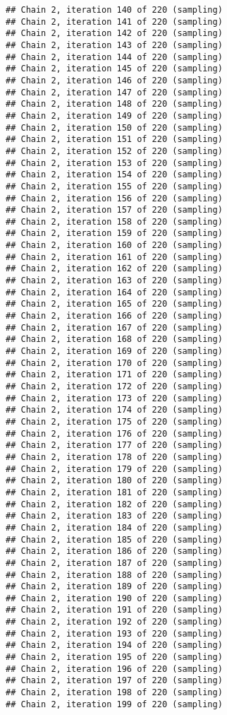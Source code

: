 \documentclass[]{book}
\begin{document}
\begin{verbatim}
## Chain 2, iteration 140 of 220 (sampling)
## Chain 2, iteration 141 of 220 (sampling)
## Chain 2, iteration 142 of 220 (sampling)
## Chain 2, iteration 143 of 220 (sampling)
## Chain 2, iteration 144 of 220 (sampling)
## Chain 2, iteration 145 of 220 (sampling)
## Chain 2, iteration 146 of 220 (sampling)
## Chain 2, iteration 147 of 220 (sampling)
## Chain 2, iteration 148 of 220 (sampling)
## Chain 2, iteration 149 of 220 (sampling)
## Chain 2, iteration 150 of 220 (sampling)
## Chain 2, iteration 151 of 220 (sampling)
## Chain 2, iteration 152 of 220 (sampling)
## Chain 2, iteration 153 of 220 (sampling)
## Chain 2, iteration 154 of 220 (sampling)
## Chain 2, iteration 155 of 220 (sampling)
## Chain 2, iteration 156 of 220 (sampling)
## Chain 2, iteration 157 of 220 (sampling)
## Chain 2, iteration 158 of 220 (sampling)
## Chain 2, iteration 159 of 220 (sampling)
## Chain 2, iteration 160 of 220 (sampling)
## Chain 2, iteration 161 of 220 (sampling)
## Chain 2, iteration 162 of 220 (sampling)
## Chain 2, iteration 163 of 220 (sampling)
## Chain 2, iteration 164 of 220 (sampling)
## Chain 2, iteration 165 of 220 (sampling)
## Chain 2, iteration 166 of 220 (sampling)
## Chain 2, iteration 167 of 220 (sampling)
## Chain 2, iteration 168 of 220 (sampling)
## Chain 2, iteration 169 of 220 (sampling)
## Chain 2, iteration 170 of 220 (sampling)
## Chain 2, iteration 171 of 220 (sampling)
## Chain 2, iteration 172 of 220 (sampling)
## Chain 2, iteration 173 of 220 (sampling)
## Chain 2, iteration 174 of 220 (sampling)
## Chain 2, iteration 175 of 220 (sampling)
## Chain 2, iteration 176 of 220 (sampling)
## Chain 2, iteration 177 of 220 (sampling)
## Chain 2, iteration 178 of 220 (sampling)
## Chain 2, iteration 179 of 220 (sampling)
## Chain 2, iteration 180 of 220 (sampling)
## Chain 2, iteration 181 of 220 (sampling)
## Chain 2, iteration 182 of 220 (sampling)
## Chain 2, iteration 183 of 220 (sampling)
## Chain 2, iteration 184 of 220 (sampling)
## Chain 2, iteration 185 of 220 (sampling)
## Chain 2, iteration 186 of 220 (sampling)
## Chain 2, iteration 187 of 220 (sampling)
## Chain 2, iteration 188 of 220 (sampling)
## Chain 2, iteration 189 of 220 (sampling)
## Chain 2, iteration 190 of 220 (sampling)
## Chain 2, iteration 191 of 220 (sampling)
## Chain 2, iteration 192 of 220 (sampling)
## Chain 2, iteration 193 of 220 (sampling)
## Chain 2, iteration 194 of 220 (sampling)
## Chain 2, iteration 195 of 220 (sampling)
## Chain 2, iteration 196 of 220 (sampling)
## Chain 2, iteration 197 of 220 (sampling)
## Chain 2, iteration 198 of 220 (sampling)
## Chain 2, iteration 199 of 220 (sampling)

\end{verbatim}
\end{document}
